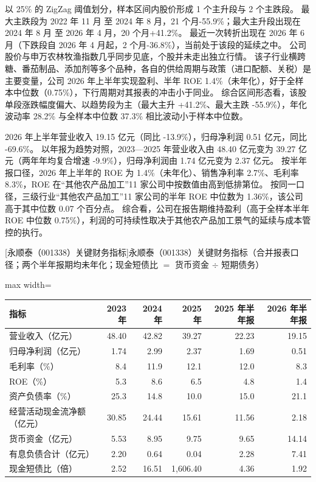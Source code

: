  以 25\% 的 ZigZag 阈值划分，样本区间内股价形成 1 个主升段与 2 个主跌段。 最大主跌段为 2022 年 11 月 至 2024 年 8 月，21 个月-55.9\%；最大主升段出现在 2024 年 8 月 至 2026 年 4 月，20 个月+41.2\%。 最近一次转折出现在 2026 年 6 月（下跌段自 2026 年 4 月起，2 个月-36.8\%），当前处于该段的延续之中。 公司股价与申万农林牧渔指数几乎同步见底，个股并未走出独立行情。 该子行业横跨糖、番茄制品、添加剂等多个品种，各自的供给周期与政策（进口配额、关税）是主要变量，公司 2026 年上半年实现盈利、半年 ROE 1.4\%（未年化），好于全样本中位数（0.75\%），下行周期对其报表的冲击小于同业。 综合区间形态看，该股单段涨跌幅度偏大、以趋势段为主（最大主升 +41.2\%、最大主跌 -55.9\%），年化波动率 28.2\% 与全样本中位数 37.3\% 相比波动小于样本中位数。

 2026 年上半年营业收入 19.15 亿元（同比 -13.9\%），归母净利润 0.51 亿元，同比 -69.6\%。 以年报为趋势对照，2023---2025 年营业收入由 48.40 亿元变为 39.27 亿元（两年年均复合增速 -9.9\%），归母净利润由 1.74 亿元变为 2.37 亿元。 按半年报口径，2026 年上半年的 ROE 为 1.4\%（未年化）、销售净利率 2.7\%、毛利率 8.3\%，ROE 在“其他农产品加工”11 家公司中按数值由高到低排第位。 按同一口径，三级行业“其他农产品加工”11 家公司的半年 ROE 中位数为 1.36\%，该公司高于其中位数 0.07 个百分点。 综合看，公司在报告期维持盈利（高于全样本半年 ROE 中位数 0.75\%），利润的可持续性取决于其他农产品加工景气的延续与成本管控的执行。

\begin{center}\small\setlength{\tabcolsep}{3.4pt}
[永顺泰（001338）关键财务指标]{永顺泰（001338）关键财务指标（合并报表口径；两个半年报期均未年化；现金短债比 $=$ 货币资金 $\div$ 短期债务）}
\begin{adjustbox}{max width=\textwidth}
\begin{tabular}{@{}lrrrrr@{}}
\toprule
指标 & 2023 年 & 2024 年 & 2025 年 & 2025 年半年报 & 2026 年半年报 \\
\midrule
营业收入（亿元） & 48.40 & 42.82 & 39.27 & 22.23 & 19.15 \\
归母净利润（亿元） & 1.74 & 2.99 & 2.37 & 1.69 & 0.51 \\
毛利率（\%） & 8.4 & 11.9 & 12.1 & 12.0 & 8.3 \\
ROE（\%） & 5.3 & 8.6 & 6.5 & 4.8 & 1.4 \\
资产负债率（\%） & 25.3 & 14.8 & 10.0 & 15.0 & 21.1 \\
经营活动现金流净额（亿元） & 30.85 & 24.44 & 15.61 & 11.56 & 2.18 \\
货币资金（亿元） & 5.53 & 8.95 & 9.75 & 9.65 & 14.14 \\
有息负债合计（亿元） & 2.20 & 0.64 & 0.04 & 2.28 & 7.41 \\
现金短债比（倍） & 2.52 & 16.51 & 1,606.40 & 4.36 & 1.92 \\
\bottomrule
\end{tabular}
\end{adjustbox}
\end{center}

